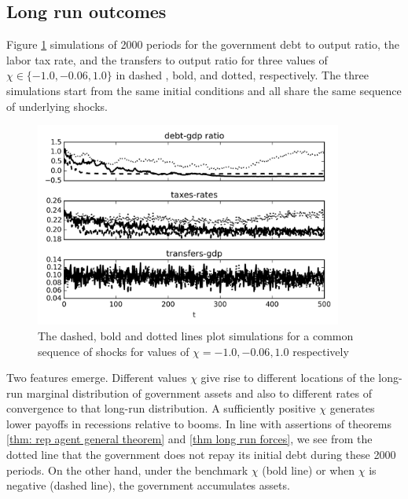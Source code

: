 \documentclass[thmsb,11pt]{article}
\begin{document}
\subsection{Long run outcomes}\label{sec:longrunsimul}
Figure \ref{fig:long_simulation} simulations of  2000 periods for the government debt to output ratio, the labor tax rate,  and the transfers to output ratio
for three values of $\chi \in \{-1.0,-0.06,1.0\}$ in dashed , bold, and dotted, respectively. The three simulations start from the  same initial conditions and
all share the same sequence of underlying shocks.

 {
  \begin{figure}
  \label{fig:long_simulation}
    \centering
    \includegraphics[width = 0.9\textwidth]{cesplots/long_simulation_debt.png}
    \caption{The dashed, bold and dotted lines plot simulations for a common sequence of shocks for values of $\chi=-1.0,-0.06,1.0$ respectively}
  \end{figure}

}

Two features emerge. Different values $\chi$ give rise to different locations of the long-run marginal distribution of government assets and also to different  rates  of convergence
to that long-run distribution.
A sufficiently positive $\chi$ generates lower payoffs in recessions relative to booms. In line with assertions of  theorems \ref{thm: rep agent general theorem} and  \ref{thm long run forces},
we see from the dotted line  that  the government does not repay its initial debt during these 2000 periods. On the other
hand, under the benchmark $\chi$  (bold line) or  when $\chi$ is negative (dashed line), the government accumulates assets.
\end{document}
